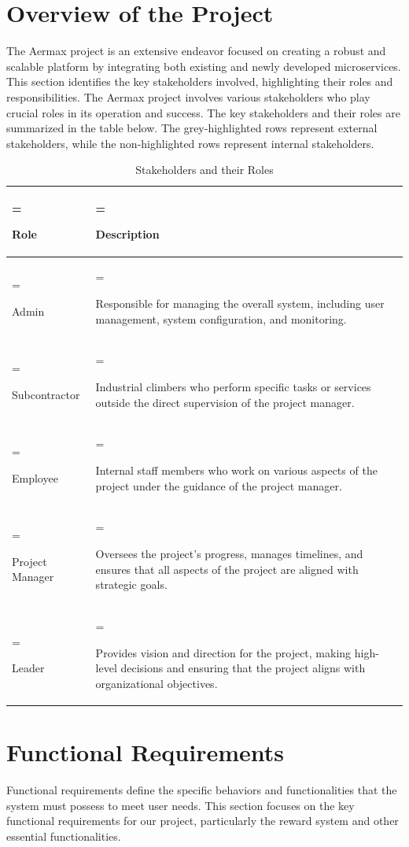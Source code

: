 \section{Overview of the Project}
The Aermax project is an extensive endeavor focused on creating a robust and scalable platform by integrating both existing and newly developed microservices.  \\
This section identifies the key stakeholders involved, highlighting their roles and responsibilities. The Aermax project involves various stakeholders who play crucial roles in its operation and success. The key stakeholders and their roles are summarized in the table below. The grey-highlighted rows represent external stakeholders, while the non-highlighted rows represent internal stakeholders.
\begin{table}[h!]
    \centering
    \renewcommand{\arraystretch}{1.5} %
    \caption{Stakeholders and their Roles}
    \label{tab:stakeholders_roles}
    \begin{tabularx}{\textwidth} {
            | >{\hsize=0.4\hsize\linewidth=\hsize\raggedright\arraybackslash}X
            | >{\hsize=1.6\hsize\linewidth=\hsize\raggedright\arraybackslash}X |}
        \hline
         \textbf{Role} & \textbf{Description} \\
        \hline
        Admin & Responsible for managing the overall system, including user management, system configuration, and monitoring. \\
        \hline
        \rowcolor{gray!20} Subcontractor & Industrial climbers who perform specific tasks or services outside the direct supervision of the project manager. \\
        \hline
        Employee & Internal staff members who work on various aspects of the project under the guidance of the project manager. \\
        \hline
        Project Manager & Oversees the project's progress, manages timelines, and ensures that all aspects of the project are aligned with strategic goals. \\
        \hline
        \rowcolor{gray!20} Leader & Provides vision and direction for the project, making high-level decisions and ensuring that the project aligns with organizational objectives. \\
        \hline
    \end{tabularx}
\end{table}
\FloatBarrier
\section{Functional Requirements}
Functional requirements define the specific behaviors and functionalities that the system must possess to meet user needs. This section focuses on the key functional requirements for our project, particularly the reward system and other essential functionalities.

